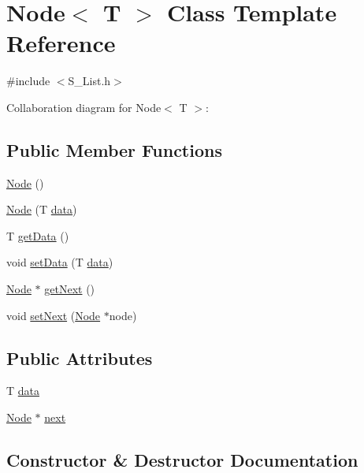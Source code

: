 \hypertarget{classNode}{}\section{Node$<$ T $>$ Class Template Reference}
\label{classNode}


{\ttfamily \#include $<$S\+\_\+\+List.\+h$>$}



Collaboration diagram for Node$<$ T $>$\+:
\subsection*{Public Member Functions}
\begin{DoxyCompactItemize}
\item 
\hyperlink{classNode_a0ac1d44cfe588be564acf25485029bd8}{Node} ()
\item 
\hyperlink{classNode_a0692b16d246460bf94c18d49592facdd}{Node} (T \hyperlink{classNode_ac450c71a8677a38d306361f9ced518d3}{data})
\item 
T \hyperlink{classNode_a0c3315ee2e897e2a6e1c24aeca20aeb9}{get\+Data} ()
\item 
void \hyperlink{classNode_a3955130f36c0a6d39641dee186caf2a3}{set\+Data} (T \hyperlink{classNode_ac450c71a8677a38d306361f9ced518d3}{data})
\item 
\hyperlink{classNode}{Node} $\ast$ \hyperlink{classNode_aaf2b6c875d0972479da9a26fca47db54}{get\+Next} ()
\item 
void \hyperlink{classNode_a2813e2e895d0f12b7c6bf2bf58b80cfa}{set\+Next} (\hyperlink{classNode}{Node} $\ast$node)
\end{DoxyCompactItemize}
\subsection*{Public Attributes}
\begin{DoxyCompactItemize}
\item 
T \hyperlink{classNode_ac450c71a8677a38d306361f9ced518d3}{data}
\item 
\hyperlink{classNode}{Node} $\ast$ \hyperlink{classNode_ac1c0563946c59c36bddde431b4adb00b}{next}
\end{DoxyCompactItemize}


\subsection{Constructor \& Destructor Documentation}
